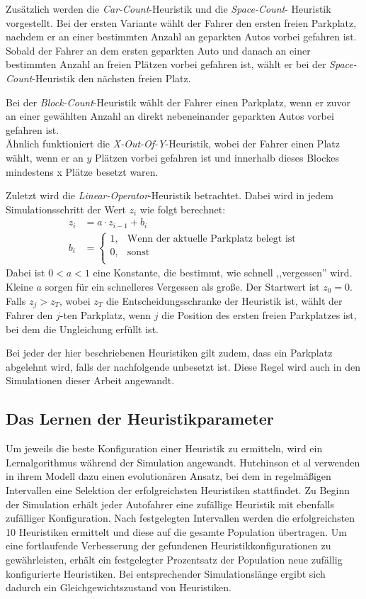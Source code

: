 Zusätzlich werden die \emph{Car-Count}-Heuristik und die \emph{Space-Count}- Heuristik vorgestellt. Bei der ersten Variante wählt der Fahrer den ersten freien Parkplatz, nachdem er an einer bestimmten Anzahl an geparkten Autos vorbei gefahren ist. Sobald der Fahrer an dem ersten geparkten Auto und danach an einer bestimmten Anzahl an freien Plätzen vorbei gefahren ist, wählt er bei der \emph{Space-Count}-Heuristik den nächsten freien Platz.

Bei der \emph{Block-Count}-Heuristik wählt der Fahrer einen Parkplatz, wenn er zuvor an einer gewählten Anzahl an direkt nebeneinander geparkten Autos vorbei gefahren ist.\\
Ähnlich funktioniert die \emph{X-Out-Of-Y}-Heuristik, wobei der Fahrer einen Platz wählt, wenn er an $y$ Plätzen vorbei gefahren ist und innerhalb dieses Blockes mindestens x Plätze besetzt waren. 

Zuletzt wird die \emph{Linear-Operator}-Heuristik betrachtet. Dabei wird in jedem Simulationsschritt der Wert $z_i$ wie folgt berechnet: 
\begin{align}
z_i&=a\cdot z_{i-1}+b_i\\
b_i&=\left\lbrace\begin{matrix}
1, &\text{Wenn der aktuelle Parkplatz belegt ist}\\
0, &\text{sonst}\\
\end{matrix}\right.
\end{align}
Dabei ist $0<a<1$ eine Konstante, die bestimmt, wie schnell ,,vergessen'' wird. Kleine $a$ sorgen für ein schnelleres Vergessen als große. Der Startwert ist $z_0=0$.
Falls $z_j>z_T$, wobei $z_T$ die Entscheidungsschranke der Heuristik ist, wählt der Fahrer den $j$-ten Parkplatz, wenn $j$ die Position des ersten freien Parkplatzes ist, bei dem die Ungleichung erfüllt ist. 

Bei jeder der hier beschriebenen Heuristiken gilt zudem, dass ein Parkplatz abgelehnt wird, falls der nachfolgende unbesetzt ist. Diese Regel wird auch in den Simulationen dieser Arbeit angewandt.

\subsection{Das Lernen der Heuristikparameter}
Um jeweils die beste Konfiguration einer Heuristik zu ermitteln, wird ein Lernalgorithmus während der Simulation angewandt. Hutchinson et al \cite[The Evolutionary Algorithm, S. 14]{hutchinson} verwenden in ihrem Modell dazu einen evolutionären Ansatz, bei dem in regelmäßigen Intervallen eine Selektion der erfolgreichsten Heuristiken stattfindet. Zu Beginn der Simulation erhält jeder Autofahrer eine zufällige Heuristik mit ebenfalls zufälliger Konfiguration. Nach festgelegten Intervallen werden die erfolgreichsten 10 Heuristiken ermittelt und diese auf die gesamte Population übertragen. Um eine fortlaufende Verbesserung der gefundenen Heuristikkonfigurationen zu gewährleisten, erhält ein festgelegter Prozentsatz der Population neue zufällig konfigurierte Heuristiken. Bei entsprechender Simulationslänge ergibt sich dadurch ein Gleichgewichtszustand von Heuristiken. 

